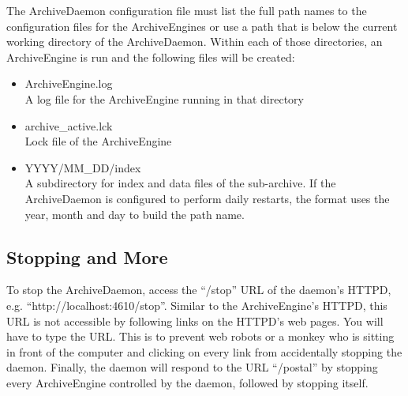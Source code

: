 \noindent The ArchiveDaemon configuration file must list the full path
names to the configuration files for the ArchiveEngines or use a path
that is below the current working directory of the ArchiveDaemon.
Within each of those directories, an ArchiveEngine is run and the
following files will be created:
\begin{itemize}
\item ArchiveEngine.log\\
  A log file for the ArchiveEngine running in that directory
\item archive\_active.lck\\
  Lock file of the ArchiveEngine
\item YYYY/MM\_DD/index \\
  A subdirectory for index and data files of the sub-archive.  If the
  ArchiveDaemon is configured to perform daily restarts, the format
  uses the year, month and day to build the path name.
\end{itemize}

\subsection{Stopping and More}
To stop the ArchiveDaemon, access the ``/stop'' URL of the daemon's
HTTPD, e.g. ``http://localhost:4610/stop''.  Similar to the
ArchiveEngine's HTTPD, this URL is not accessible by following links
on the HTTPD's web pages. You will have to type the URL. This is to
prevent web robots or a monkey who is sitting in front of the computer
and clicking on every link from accidentally stopping the daemon.
Finally, the daemon will respond to the URL ``/postal'' by stopping every
ArchiveEngine controlled by the daemon, followed by stopping itself.